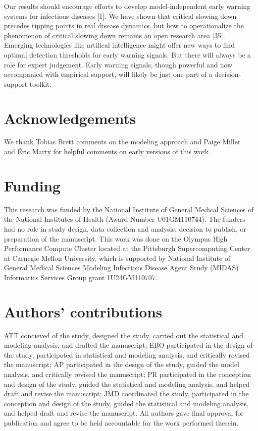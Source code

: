 \documentclass[3p]{elsarticle} %
\begin{document}
Our results should encourage efforts to develop model-independent early
warning systems for infectious diseases {[}1{]}. We have shown that
critical slowing down precedes tipping points in real disease dynamics,
but how to operationalize the phenomenon of critical slowing down
remains an open research area {[}35{]}. Emerging technologies like
artifical intelligence might offer new ways to find optimal detection
thresholds for early warning signals. But there will always be a role
for expert judgement. Early warning signals, though powerful and now
accompanied with empirical support, will likely be just one part of a
decision-support toolkit.

\hypertarget{acknowledgements}{%
\section{Acknowledgements}\label{acknowledgements}}

We thank Tobias Brett comments on the modeling approach and Paige Miller
and Éric Marty for helpful comments on early versions of this work.

\hypertarget{funding}{%
\section{Funding}\label{funding}}

This research was funded by the National Institute of General Medical
Sciences of the National Institutes of Health (Award Number
U01GM110744). The funders had no role in study design, data collection
and analysis, decision to publish, or preparation of the manuscript.
This work was done on the Olympus High Performance Compute Cluster
located at the Pittsburgh Supercomputing Center at Carnegie Mellon
University, which is supported by National Institute of General Medical
Sciences Modeling Infectious Disease Agent Study (MIDAS) Informatics
Services Group grant 1U24GM110707.

\hypertarget{authors-contributions}{%
\section{Authors' contributions}\label{authors-contributions}}

ATT concieved of the study, designed the study, carried out the
statistical and modeling analysis, and drafted the manuscript; EBO
participated in the design of the study, participated in statistical and
modeling analysis, and critically revised the manuscript; AP
participated in the design of the study, guided the model analysis, and
critically revised the manuscript; PR participated in the conception and
design of the study, guided the statistical and modeling analysis, and
helped draft and revise the manuscript; JMD coordinated the study,
participated in the conception and design of the study, guided the
statistical and modeling analysis, and helped draft and revise the
manuscript. All authors gave final approval for publication and agree to
be held accountable for the work performed therein.
\end{document}
